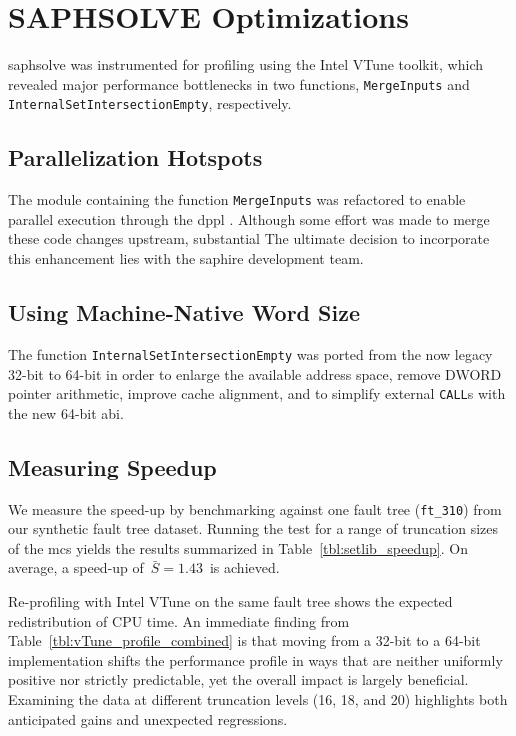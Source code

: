 \section{SAPHSOLVE Optimizations}
\label{sec:saphsolve_optimizations}

\acrshort{saphsolve} was instrumented for profiling using the Intel VTune toolkit, which revealed major performance bottlenecks in two functions, \texttt{MergeInputs} and \texttt{InternalSetIntersectionEmpty}, respectively.

\subsection{Parallelization Hotspots}
\label{sec:saphsolve_opt}
The module containing the function \texttt{MergeInputs} was refactored to enable parallel execution through the \acrfull{dppl} \cite{Delphi}. Although some effort was made to merge these code changes upstream, substantial The ultimate decision to incorporate this enhancement lies with the \acrshort{saphire} development team.

\subsection{Using Machine-Native Word Size}
The function \texttt{InternalSetIntersectionEmpty} was ported from the now legacy 32-bit to 64-bit in order to enlarge the available address space, remove \textsf{DWORD} pointer arithmetic, improve cache alignment, and to simplify external \texttt{CALL}s with the new 64-bit \acrfull{abi}.

\subsection{Measuring Speedup}
We measure the speed-up by benchmarking against one fault tree (\texttt{ft\_310}) from our synthetic fault tree dataset. Running the test for a range of truncation sizes of the \acrshort{mcs} yields the results summarized in Table~\ref{tbl:setlib_speedup}.  On average, a speed-up of $\,\bar S = 1.43\,$ is achieved.



Re-profiling with Intel VTune on the same fault tree shows the expected redistribution of CPU time. An immediate finding from Table~\ref{tbl:vTune_profile_combined} is that moving from a 32-bit to a 64-bit implementation shifts the performance profile in ways that are neither uniformly positive nor strictly predictable, yet the overall impact is largely beneficial. Examining the data at different truncation levels (16, 18, and 20) highlights both anticipated gains and unexpected regressions.

